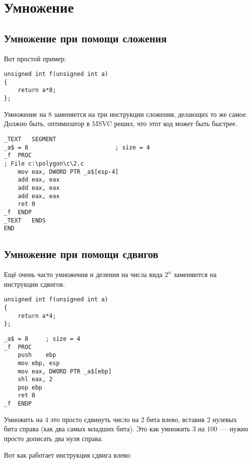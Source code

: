 ﻿\section{Умножение}

\subsection{Умножение при помощи сложения}

Вот простой пример:

\begin{lstlisting}[caption=\Optimizing MSVC 2010]
unsigned int f(unsigned int a)
{
	return a*8;
};
\end{lstlisting}

Умножение на 8 заменяется на три инструкции сложения, делающих то же самое.
Должно быть, оптимизатор в MSVC решил, что этот код может быть быстрее.

\begin{lstlisting}
_TEXT	SEGMENT
_a$ = 8							; size = 4
_f	PROC
; File c:\polygon\c\2.c
	mov	eax, DWORD PTR _a$[esp-4]
	add	eax, eax
	add	eax, eax
	add	eax, eax
	ret	0
_f	ENDP
_TEXT	ENDS
END
\end{lstlisting}

\subsection{Умножение при помощи сдвигов}
\label{subsec:mult_using_shifts}

Ещё очень часто умножения и деления на числа вида $2^{n}$ заменяются на инструкции сдвигов.

\begin{lstlisting}
unsigned int f(unsigned int a)
{
	return a*4;
};
\end{lstlisting}

\begin{lstlisting}[caption=\NonOptimizing MSVC 2010]
_a$ = 8		; size = 4
_f	PROC
	push	ebp
	mov	ebp, esp
	mov	eax, DWORD PTR _a$[ebp]
	shl	eax, 2
	pop	ebp
	ret	0
_f	ENDP
\end{lstlisting}

Умножить на 4 это просто сдвинуть число на 2 бита влево, 
вставив 2 нулевых бита справа (как два самых младших бита). 
Это как умножить 3 на 100~--- нужно просто дописать два нуля справа.

Вот как работает инструкция сдвига влево:



